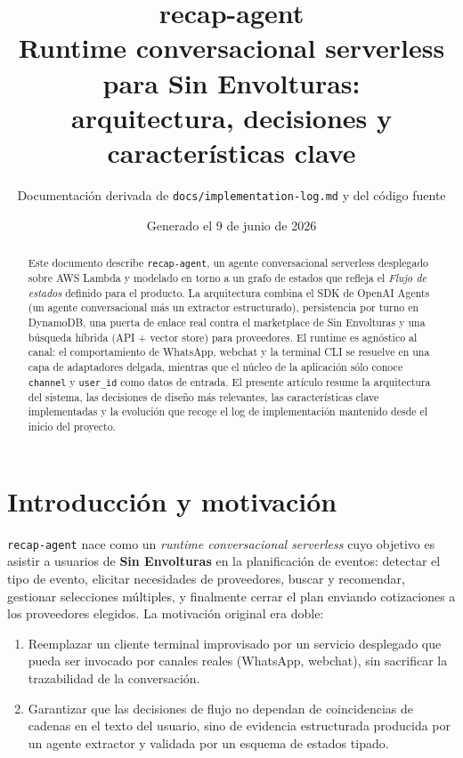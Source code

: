\documentclass[11pt,a4paper]{article}
\title{\textbf{recap-agent}\\[0.4em]
       \large Runtime conversacional serverless para Sin Envolturas:\\
       arquitectura, decisiones y características clave}
\author{Documentación derivada de \texttt{docs/implementation-log.md} y del código fuente}
\date{Generado el 9 de junio de 2026}
\begin{document}
\maketitle

\begin{abstract}
\noindent
Este documento describe \texttt{recap-agent}, un agente conversacional serverless
desplegado sobre AWS Lambda y modelado en torno a un grafo de estados que
refleja el \emph{Flujo de estados} definido para el producto. La arquitectura
combina el SDK de OpenAI Agents (un agente conversacional más un extractor
estructurado), persistencia por turno en DynamoDB, una puerta de enlace real
contra el marketplace de Sin Envolturas y una búsqueda híbrida (API +
vector store) para proveedores. El runtime es agnóstico al canal: el
comportamiento de WhatsApp, webchat y la terminal CLI se resuelve en una capa
de adaptadores delgada, mientras que el núcleo de la aplicación sólo conoce
\texttt{channel} y \texttt{user\_id} como datos de entrada. El presente
artículo resume la arquitectura del sistema, las decisiones de diseño más
relevantes, las características clave implementadas y la evolución que
recoge el log de implementación mantenido desde el inicio del proyecto.
\end{abstract}

\tableofcontents
\bigskip

\section{Introducción y motivación}

\texttt{recap-agent} nace como un \emph{runtime conversacional serverless} cuyo
objetivo es asistir a usuarios de \textbf{Sin Envolturas} en la planificación
de eventos: detectar el tipo de evento, elicitar necesidades de proveedores,
buscar y recomendar, gestionar selecciones múltiples, y finalmente cerrar el
plan enviando cotizaciones a los proveedores elegidos. La motivación original
era doble:

\begin{enumerate}[leftmargin=*,itemsep=2pt]
  \item Reemplazar un cliente terminal improvisado por un servicio desplegado
        que pueda ser invocado por canales reales (WhatsApp, webchat), sin
        sacrificar la trazabilidad de la conversación.
  \item Garantizar que las decisiones de flujo no dependan de coincidencias
        de cadenas en el texto del usuario, sino de evidencia estructurada
        producida por un agente extractor y validada por un esquema de
        estados tipado.
\end{enumerate}
\end{document}
